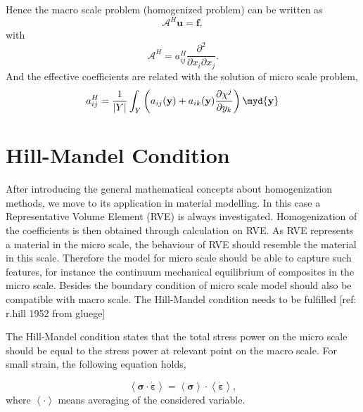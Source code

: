 Hence the macro scale problem (homogenized problem) can be written as
\begin{equation}
\mathcal{A}^{H} \mathbf{u} = \mathbf{f},
\end{equation}
with
\begin{equation}
\mathcal{A}^{H} = a^{H}_{ij} \dfrac{\partial^{2}}{\partial x_{i} \partial x_{j}}.
\end{equation}
%
And the effective coefficients are related with the solution of micro scale problem,
\begin{equation}
a^{H}_{ij} = \dfrac{1}{|Y|} \int_{Y} \left( a_{ij}(\mathbf{y}) + a_{ik}(\mathbf{y}) \dfrac{\partial \chi^{j}}{\partial y_{k}} \right) \myd{\mathbf{y}}
\end{equation}

\section{Hill-Mandel Condition}
After introducing the general mathematical concepts about homogenization methods, we move to its application in material modelling. In this case a Representative Volume Element (RVE) is always investigated. Homogenization of the coefficients is then obtained through calculation on RVE. As RVE represents a material in the micro scale, the behaviour of RVE should resemble the material in this scale. Therefore the model for micro scale should be able to capture such features, for instance the continuum mechanical equilibrium of composites in the micro scale. Besides the boundary condition of micro scale model should also be compatible with macro scale. The Hill-Mandel condition needs to be fulfilled [ref: r.hill 1952 from gluege]

The Hill-Mandel condition states that the total stress power on the micro scale should be equal to the stress power at relevant point on the macro scale. For small strain, the following equation holds,

\begin{equation}
\left< \bm{\sigma} \cdot \dot{\bm{\varepsilon}} \right> = \left< \bm{\sigma} \right> \cdot \left< \dot{\bm{\varepsilon}} \right>,
\end{equation}
where $\left< \cdot \right>$ means averaging of the considered variable.

%
%
%
%
%
%
%
%
%
%
%
%
%
%
%
%
%
%
%
%
